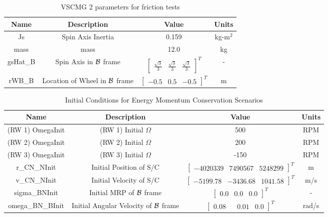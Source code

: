 \begin{table}[htbp]
	\caption{VSCMG 2 parameters for friction tests}
	\label{tab:rwFriction2}
	\centering \fontsize{10}{10}\selectfont
	\begin{tabular}{ c | c | c | c } %
		\hline
		\textbf{Name}  & \textbf{Description}  & \textbf{Value} & \textbf{Units} \\
		\hline
		Js  & Spin Axis Inertia & 0.159 & kg-m$^2$ \\
		mass & mass & 12.0 & kg \\
		gsHat\_B & Spin Axis in $\cal{B}$ frame & $\begin{bmatrix}
		\frac{\sqrt{3}}{3} & \frac{\sqrt{3}}{3} & \frac{\sqrt{3}}{3} \end{bmatrix}^T$ & - \\
		rWB\_B & Location of Wheel in $\cal{B}$ frame & $\begin{bmatrix}
		-0.5 & 0.5 & -0.5 \end{bmatrix}^T$ & m \\
		\hline
	\end{tabular}
\end{table}

\begin{table}[htbp]
	\caption{Initial Conditions for Energy Momentum Conservation Scenarios}
	\label{tab:initial}
	\centering \fontsize{10}{10}\selectfont
	\begin{tabular}{ c | c | c | c } %
		\hline
		\textbf{Name}  & \textbf{Description}  & \textbf{Value} & \textbf{Units} \\
		\hline
		(RW 1) OmegaInit  & (RW 1) Initial $\Omega$ & 500 & RPM \\
		(RW 2) OmegaInit  & (RW 2) Initial $\Omega$ & 200 & RPM \\
		(RW 3) OmegaInit  & (RW 3) Initial $\Omega$ & -150 & RPM \\
		r\_CN\_NInit & Initial Position of S/C & $\begin{bmatrix}
		-4020339 &	7490567 & 5248299 
		\end{bmatrix}^T$ & m \\
		v\_CN\_NInit & Initial Velocity of S/C & $\begin{bmatrix}
		-5199.78 & -3436.68 & 1041.58
		\end{bmatrix}^T$ & m/s \\
		sigma\_BNInit & Initial MRP of $\cal{B}$ frame & $\begin{bmatrix}
		0.0 & 0.0 & 0.0
		\end{bmatrix}^T$ & - \\
		omega\_BN\_BInit & Initial Angular Velocity of $\cal{B}$ frame & $\begin{bmatrix}
		0.08 & & 0.01 & 0.0
		\end{bmatrix}^T$ & rad/s \\
		\hline
	\end{tabular}
\end{table}

